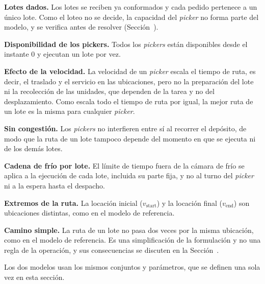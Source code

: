 \startitemize
	\item {\bf Lotes dados.} Los lotes se reciben ya conformados y cada pedido
	pertenece a un único lote. Como el loteo no se decide, la capacidad del {\em picker} no forma parte del modelo, y se verifica antes de resolver
	(Sección~).
	\item {\bf Disponibilidad de los pickers.} Todos los {\em pickers} están
	disponibles desde el instante 0 y ejecutan un lote por vez.
	\item {\bf Efecto de la velocidad.} La velocidad de un {\em picker} escala el
	tiempo de ruta, es decir, el traslado y el servicio en las ubicaciones,
	pero no la preparación del lote ni la recolección de las unidades, que
	dependen de la tarea y no del desplazamiento. Como escala todo el tiempo de
	ruta por igual, la mejor ruta de un lote es la misma para cualquier
	{\em picker}.
	\item {\bf Sin congestión.} Los {\em pickers} no interfieren entre sí al
	recorrer el depósito, de modo que la ruta de un lote tampoco depende del
	momento en que se ejecuta ni de los demás lotes.
	\item {\bf Cadena de frío por lote.} El límite de tiempo fuera de la cámara
	de frío se aplica a la ejecución de cada lote, incluida su parte fija, y
	no al turno del {\em picker} ni a la espera hasta el despacho.
	\item {\bf Extremos de la ruta.} La locación inicial ($v_{\text{start}}$) y la locación
    final ($v_{\text{end}}$) son ubicaciones distintas, como en el modelo de referencia.
	\item {\bf Camino simple.} La ruta de un lote no pasa dos veces por la misma
	ubicación, como en el modelo de referencia. Es una simplificación de la
	formulación y no una regla de la operación, y sus consecuencias se
	discuten en la Sección~.
\stopitemize

\startsection[title={Notación común}, reference=sec:notacion]

Los dos modelos usan los mismos conjuntos y parámetros, que se definen una
sola vez en esta sección.

\startsubsection[title={Conjuntos}]

\startformula
	\startalign[n=2, align={right,left}]
		\NC {} \NC \quad {} \NR
		\NC {} \NC \quad {} \NR
		\NC {} \NC \quad {} \NR
		\NC {} \NC \quad {} \NR
		\NC {} \NC \quad {} \NR
	\stopalign
\stopformula

